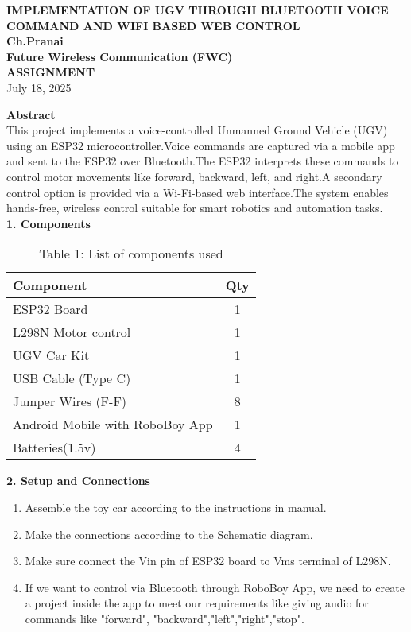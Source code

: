 \documentclass[12pt]{article}
\begin{document}
\begin{center}
    \textbf{\Large IMPLEMENTATION OF UGV THROUGH BLUETOOTH VOICE COMMAND AND WIFI BASED WEB CONTROL} \\[10pt]
    \textbf{Ch.Pranai} \\
    \textbf{Future Wireless Communication (FWC)} \\
    \textbf{ASSIGNMENT} \\[5pt]
    July 18, 2025
\end{center}
\vspace{1em}

\begin{multicols}{2}

\noindent\textbf{Abstract} \\[0.5em]
\noindent This project implements a voice-controlled Unmanned Ground Vehicle (UGV) using an ESP32 microcontroller.Voice commands are captured via a mobile app and sent to the ESP32 over Bluetooth.The ESP32 interprets these commands to control motor movements like forward, backward, left, and right.A secondary control option is provided via a Wi-Fi-based web interface.The system enables hands-free, wireless control suitable for smart robotics and automation tasks.\\

\vspace{1em}
\noindent\textbf{1. Components}
\begin{table}[H]
\small
\centering
\begin{tabular}{|p{4.2cm}|c|}
\hline
\textbf{Component} & \textbf{Qty} \\
\hline
ESP32  Board & 1 \\
L298N Motor control & 1\\
UGV Car Kit & 1 \\
USB Cable (Type C) & 1 \\
Jumper Wires (F-F) & 8 \\
Android Mobile with RoboBoy App & 1 \\
Batteries(1.5v) & 4\\
\hline
\end{tabular}
\caption*{Table 1: List of components used}
\end{table}

\vspace{1em}
\noindent\textbf{2. Setup and Connections}
\begin{enumerate}
    \item Assemble the toy car according to the instructions in  manual.
    \item Make the connections according to the Schematic diagram.
    \item Make sure connect the Vin pin of ESP32 board to Vms terminal of L298N.
    \item If we want to control via Bluetooth through RoboBoy App, we need to create a project inside the app to meet our requirements like giving audio for commands like  "forward", "backward","left","right","stop".
\end{enumerate}


\end{multicols}
\end{document}
